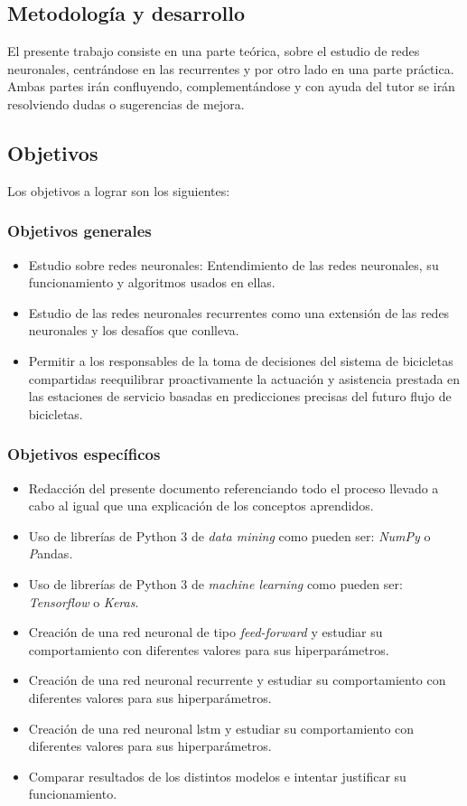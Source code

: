\subsection{Metodología y desarrollo}
El presente trabajo consiste en una parte teórica, sobre el estudio de redes neuronales, centrándose en las recurrentes y por otro lado en una parte práctica. Ambas partes irán confluyendo, complementándose y con ayuda del tutor se irán resolviendo dudas o sugerencias de mejora.

\subsection{Objetivos}
Los objetivos a lograr son los siguientes:
\subsubsection{Objetivos generales}
\begin{itemize}
    \item Estudio sobre redes neuronales: Entendimiento de las redes neuronales, su funcionamiento y algoritmos usados en ellas.
    \item Estudio de las redes neuronales recurrentes como una extensión de las redes neuronales y los desafíos que conlleva.
    \item Permitir a los responsables de la toma de decisiones del sistema de bicicletas compartidas reequilibrar proactivamente la actuación y asistencia prestada en las estaciones de servicio basadas en predicciones precisas del futuro flujo de bicicletas.
\end{itemize}

\subsubsection{Objetivos específicos}
\begin{itemize}
    \item Redacción del presente documento referenciando todo el proceso llevado a cabo al igual que una explicación de los conceptos aprendidos.
    \item Uso de librerías de Python 3 de \textit{data mining} como pueden ser: \textit{NumPy} o \textit{P}andas.
    \item Uso de librerías de Python 3 de \textit{machine learning} como pueden ser: \textit{Tensorflow} o \textit{Keras}.
    \item Creación de una red neuronal de tipo \textit{feed-forward} y estudiar su comportamiento con diferentes valores para sus hiperparámetros.
    \item Creación de una red neuronal recurrente y estudiar su comportamiento con diferentes valores para sus hiperparámetros.
    \item Creación de una red neuronal \acrshort{lstm} y estudiar su comportamiento con diferentes valores para sus hiperparámetros.
    \item Comparar resultados de los distintos modelos e intentar justificar su funcionamiento.
\end{itemize}